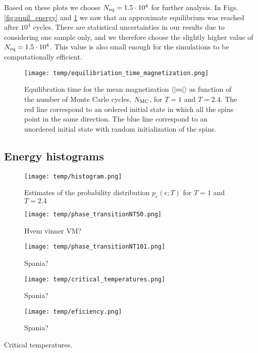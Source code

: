 Based on these plots we choose $N_\mathrm{eq}=1.5\cdot10^4$ for further analysis. In Figs. \ref{fig:equil_energy} and \ref{fig:equil_magn} we saw that an approximate equilibrium was reached after $10^4$ cycles. There are statistical uncertainties in our results due to considering one sample only, and we therefore choose the slightly higher value of $N_\mathrm{eq}=1.5\cdot10^4$. This value is also small enough for the simulations to be computationally efficient. 

\begin{figure}[!ht]
    \texttt{[image: temp/equilibriation\_time\_magnetization.png]}
    \caption{Equilibration time for the mean magnetization $\langle \vert m \vert \rangle$ as function of the number of Monte Carlo cycles, $N_\mathrm{MC}$, for $T=1$ and $T=2.4$. The red line correspond to an ordered initial state in which all the spins point in the same direction. The blue line correspond to an unordered initial state with random initialization of the spins.}
    \label{fig:equil_magn}
\end{figure}

\subsection{Energy histograms}\label{subsec_results:histogram}
\begin{figure}[!ht]
    \texttt{[image: temp/histogram.png]}
    \caption{Estimates of the probability distribution $p_e(\epsilon; T)$ for $T=1$ and $T=2.4$}
    \label{fig:histogram}
\end{figure}


\begin{figure*}[!ht]
    \texttt{[image: temp/phase\_transitionNT50.png]} 
    \caption{Hvem vinner VM?}
    \label{fig:phase_transition}
\end{figure*} 

\begin{figure}[!ht]
    \texttt{[image: temp/phase\_transitionNT101.png]} 
    \caption{Spania?}
    \label{fig:phase_transition_zoomed}
\end{figure} 

\begin{figure}[!ht]
    \texttt{[image: temp/critical\_temperatures.png]} 
    \caption{Spania?}
    \label{fig:critical_temperatures}
\end{figure} 

\begin{figure}[!ht]
    \texttt{[image: temp/eficiency.png]} 
    \caption{Spania?}
    \label{fig:efficiency}
\end{figure} 





\begin{table}[!ht]
    
    \caption{Critical temperatures.}
    \label{tab:critical_temperatures}
\end{table}


